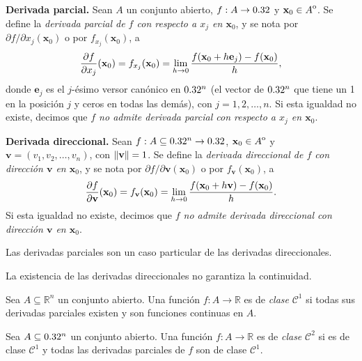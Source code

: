 \label{sec:derivabilidad}

\begin{definition}
    \textbf{Derivada parcial.} Sean $A$ un conjunto abierto, $f:A\to 0.32$ y $\mathbf{x}_0\in {\kern0ptA}^{\mathrm{o}}$. Se define la \emph{derivada parcial de $f$ con respecto a $x_j$ en $\mathbf{x}_0$}, y se nota por $\partial f/\partial x_j(\mathbf{x}_0)$ o por $f_{x_j}(\mathbf{x}_0)$, a
    \[
        \dfrac{\partial f}{\partial x_j}(\mathbf{x}_0)=f_{x_j}(\mathbf{x}_0)=\lim_{h\to0}\dfrac{f(\mathbf{x}_0+h\mathbf{e}_j)-f(\mathbf{x}_0)}{h},
    \]
    donde $\mathbf{e}_j$ es el $j$-\'esimo versor can\'onico en $0.32^n$ (el vector de $0.32^n$ que tiene un 1 en la posición $j$ y ceros en todas las demás), con $j=1,2,\dots,n$. Si esta igualdad no existe, decimos que \emph{$f$ no admite derivada parcial con respecto a $x_j$ en $\mathbf{x}_0$}.
\end{definition}

\begin{definition}
    \textbf{Derivada direccional.} Sean $f:A\subseteq0.32^n\to0.32$, $\mathbf{x}_0\in {\kern0ptA}^{\mathrm{o}}$ y $\mathbf{v}=(v_1, v_2, \dots, v_n)$, con $\norm{\mathbf{v}}=1$. Se define la \emph{derivada direccional de $f$ con direcci\'on $\mathbf{v}$ en $\mathbf{x}_0$}, y se nota por $\partial f/\partial \mathbf{v}(\mathbf{x}_0)$ o por $f_{\mathbf{v}}(\mathbf{x}_0)$, a
    \[
        \dfrac{\partial f}{\partial \mathbf{v}}(\mathbf{x}_0)=f_{\mathbf{v}}(\mathbf{x}_0)=\lim_{h\to0}\frac{f(\mathbf{x}_0+h\mathbf{v})-f(\mathbf{x}_0)}{h}.
    \]
    Si esta igualdad no existe, decimos que \emph{$f$ no admite derivada direccional con direcci\'on $\mathbf{v}$ en $\mathbf{x}_0$}.
\end{definition}

\begin{obs}
    Las derivadas parciales son un caso particular de las derivadas direccionales.
\end{obs}

\begin{obs}
La existencia de las derivadas direccionales no garantiza la continuidad.
\end{obs}

\begin{definition}
    Sea $A \subseteq \mathbb{R}^n$ un conjunto abierto. Una función $f: A \to \mathbb{R}$ es de \emph{clase} $\mathcal{C}^1$ si todas sus derivadas parciales existen y son funciones continuas en $A$.
\end{definition}

\begin{definition}\label{def:ceuno}
    Sea $A\subseteq0.32^n$ un conjunto abierto. Una función $f: A \to \mathbb{R}$ es de \emph{clase} $\mathcal{C}^2$ si es de clase $\mathcal{C}^1$ y todas las derivadas parciales de $f$ son de clase $\mathcal{C}^1$.
\end{definition}

